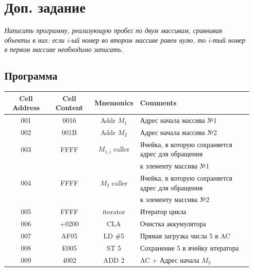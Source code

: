 \section{Доп. задание}
\textit{
Написать программу, реализующую пробег по двум массивам, сравнивая объекты в них: если i-ый номер во втором массиве
равен нулю, то i-тый номер в первом массиве необходимо записать.}

\subsection{Программа}
\begin{center}
    \begin{tabular}{|c|c|c|l|}
        \hline
        \textbf{Cell Address} & \textbf{Cell Content} & \textbf{Mnemonics} & \textbf{Comments}                                 \\
        \hline
        001                   & 0016                  & Addr $M_{1}$       & Адрес начала массива №1                           \\
        002                   & 001B                  & Addr $M_{2}$      & Адрес начала массива №2                           \\
        003                   & FFFF                  & $M_{1,i}$ caller   & Ячейка, в которую сохраняется адрес для обращения \\
        &                       &                    & к элементу массива №1                             \\
        004                   & FFFF                  & $M_{2}$ caller     & Ячейка, в которую сохраняется адрес для обращения \\
        &                       &                    & к элементу массива №2                             \\
        005                   & FFFF                  & iterator           & Итератор цикла                                    \\
        006                   & +0200                 & CLA                & Очистка аккумулятора                              \\
        007                   & AF05                  & LD \#5              & Прямая загрузка числа 5 в AC                      \\
        008                   & E005                  & ST 5               & Сохранение 5 в ячейку итератора                   \\
        009                   & 4002                  & ADD 2              & AC + Адрес начала $M_{2}$                           \\

\end{tabular}
\end{center}
